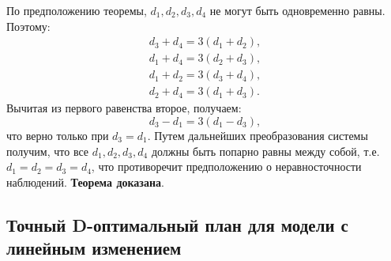 	По предположению теоремы, $d_1, d_2, d_3, d_4$ не могут быть одновременно равны. Поэтому:
	\begin{gather*}
		d_3 + d_4 = 3 (d_1 + d_2), \\
		d_1 + d_4 = 3 (d_2 + d_3), \\
		d_1 + d_2 = 3 (d_3 + d_4), \\
		d_2 + d_4 = 3 (d_1 + d_3).
	\end{gather*}
	Вычитая из первого равенства второе, получаем:
	\begin {equation*}
		d_3 - d_1 = 3 (d_1 - d_3),
	\end{equation*}
	что верно только при $d_3 = d_1$.
	Путем дальнейших преобразования системы получим, что все $d_1, d_2, d_3, d_4$ должны быть попарно равны между собой, т.е. $d_1 = d_2 = d_3 = d_4$, что противоречит предположению о неравносточности наблюдений.
	\textbf{Теорема доказана}.
	
\subsection{Точный D-оптимальный план для модели с линейным изменением}
	

